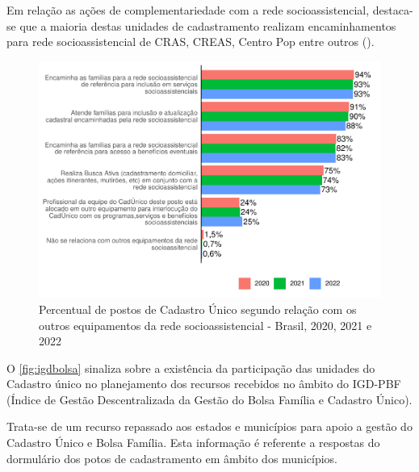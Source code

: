 \documentclass[
  brazilian]{report}
\begin{document}
Em relação as ações de complementariedade com a rede socioassistencial,
destaca-se que a maioria destas unidades de cadastramento realizam
encaminhamentos para rede socioassistencial de CRAS, CREAS, Centro Pop
entre outros ().

\begin{figure}
\includegraphics{Censo-SUAS-2022_files/figure-latex/redesuas-1} \caption[Percentual de postos de Cadastro Único segundo relação com os outros equipamentos da rede socioassistencial - Brasil, 2020, 2021 e 2022]{Percentual de postos de Cadastro Único segundo relação com os outros equipamentos da rede socioassistencial - Brasil, 2020, 2021 e 2022}\label{fig:redesuas}
\end{figure}

O \cref{fig:igdbolsa} sinaliza sobre a existência da participação das
unidades do Cadastro único no planejamento dos recursos recebidos no
âmbito do IGD-PBF (Índice de Gestão Descentralizada da Gestão do Bolsa
Família e Cadastro Único).

Trata-se de um recurso repassado aos estados e municípios para apoio a
gestão do Cadastro Único e Bolsa Família. Esta informação é referente a
respostas do dormulário dos potos de cadastramento em âmbito dos
municípios.
\end{document}
